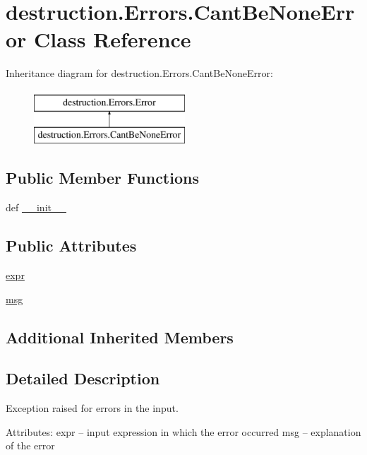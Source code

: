 \hypertarget{classdestruction_1_1_errors_1_1_cant_be_none_error}{\section{destruction.\-Errors.\-Cant\-Be\-None\-Error Class Reference}
\label{classdestruction_1_1_errors_1_1_cant_be_none_error}
}
Inheritance diagram for destruction.\-Errors.\-Cant\-Be\-None\-Error\-:\begin{figure}[H]
\begin{center}
\leavevmode
\includegraphics[height=2.000000cm]{classdestruction_1_1_errors_1_1_cant_be_none_error}
\end{center}
\end{figure}
\subsection*{Public Member Functions}
\begin{DoxyCompactItemize}
\item 
def \hyperlink{classdestruction_1_1_errors_1_1_cant_be_none_error_aa44d30ef9b19e301cd313d23390b4f9f}{\-\_\-\-\_\-init\-\_\-\-\_\-}
\end{DoxyCompactItemize}
\subsection*{Public Attributes}
\begin{DoxyCompactItemize}
\item 
\hyperlink{classdestruction_1_1_errors_1_1_cant_be_none_error_aee528431c2c9d0f39a2005d602f18bf7}{expr}
\item 
\hyperlink{classdestruction_1_1_errors_1_1_cant_be_none_error_a95fae6394740d17a8475df1aecbf9664}{msg}
\end{DoxyCompactItemize}
\subsection*{Additional Inherited Members}


\subsection{Detailed Description}
\begin{DoxyVerb}Exception raised for errors in the input.

Attributes:
    expr -- input expression in which the error occurred
    msg  -- explanation of the error
\end{DoxyVerb}
 

